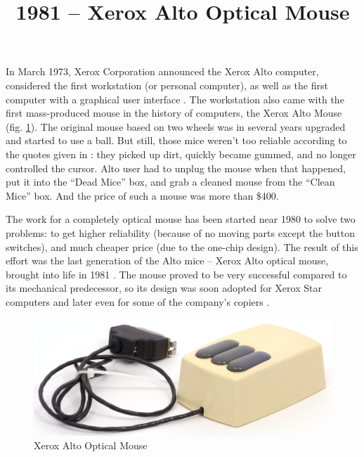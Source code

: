 \documentclass[11pt, a4paper]{article}
\begin{document}
\title{1981 -- Xerox Alto Optical Mouse}
\date{}
\maketitle
{}

In March 1973, Xerox Corporation announced the Xerox Alto computer, considered the first workstation (or personal computer), as well as the first computer with a graphical user interface \cite{wiki}. The workstation also came with the first mass-produced mouse in the history of computers, the Xerox Alto Mouse (fig. \ref{fig:XeroxAltoPic}). The original mouse based on two wheels was in several years upgraded and started to use a ball. But still, those mice weren't too reliable according to the quotes given in \cite{mouses}: they picked up dirt, quickly became gummed, and no longer controlled the cursor. Alto user had to unplug the mouse when that happened, put it into the ``Dead Mice''  box, and grab a cleaned mouse from the ``Clean Mice'' box. And the price of such a mouse was more than \$400.

The work for a completely optical mouse has been started near 1980 to solve two problems: to get higher reliability (because of no moving parts except the button switches), and much cheaper price (due to the one-chip design). The result of this effort was the last generation of the Alto mice -- Xerox Alto optical mouse, brought into life in 1981 \cite{vlsi81}. The mouse proved to be very successful compared to its mechanical predecessor, so its design was soon adopted for Xerox Star computers and later even for some of the company's copiers \cite{mouses}.

\begin{figure}[h]
    \centering
    \includegraphics[scale=0.7]{1981_xerox_alto_mouse/pic_30.jpg}
    \caption{Xerox Alto Optical Mouse}
    \label{fig:XeroxAltoPic}
\end{figure}
\end{document}
